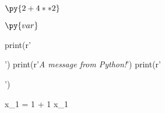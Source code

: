 $\py{2 + 4**2}$ %


$\py{var}$ %




\begin{pycode}
print(r'\begin{center}')
print(r'\textit{A message from Python!}')
print(r'\end{center}')
\end{pycode}

\begin{pyconsole}
x_1 = 1 + 1
x_1
\end{pyconsole}


